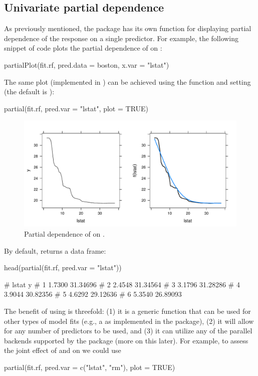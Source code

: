 \subsection{Univariate partial dependence}

As previously mentioned, the  package has its own  function for displaying partial dependence of the response on a single predictor. For example, the following snippet of code plots the partial dependence of  on :
\begin{example}
partialPlot(fit.rf, pred.data = boston, x.var = "lstat")
\end{example}
The same plot (implemented in ) can be achieved using the  function and setting  (the default is ):
\begin{example}
partial(fit.rf, pred.var = "lstat", plot = TRUE)
\end{example}
\begin{figure}[htbp]
  \centering
  \includegraphics[width=0.8\linewidth]{pd_lstat}
  \caption{Partial dependence of  on .}
  \label{fig:pd_lstat}
\end{figure}

By default,  returns a data frame:
\begin{example}
head(partial(fit.rf, pred.var = "lstat"))

#    lstat        y
# 1 1.7300 31.34696
# 2 2.4548 31.34564
# 3 3.1796 31.28286
# 4 3.9044 30.82356
# 5 4.6292 29.12636
# 6 5.3540 26.89093
\end{example}


The benefit of using  is threefold: (1) it is a generic function that can be used for other types of model fits (e.g., a  as implemented in the  package), (2) it will allow for any number of predictors to be used, and (3) it can utilize any of the parallel backends supported by the  package (more on this later). For example, to assess the joint effect of  and  on  we could use
\begin{example}
partial(fit.rf, pred.var = c("lstat", "rm"), plot = TRUE)
\end{example}

